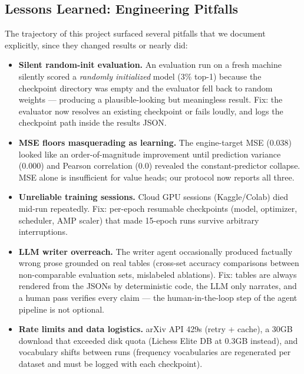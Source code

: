 \documentclass[conference,onecolumn]{IEEEtran}
\begin{document}
\subsection{Lessons Learned: Engineering Pitfalls}
The trajectory of this project surfaced several pitfalls that we document explicitly, since they changed results or nearly did:
\begin{itemize}
\item \textbf{Silent random-init evaluation.} An evaluation run on a fresh machine silently scored a \emph{randomly initialized} model (3\% top-1) because the checkpoint directory was empty and the evaluator fell back to random weights --- producing a plausible-looking but meaningless result. Fix: the evaluator now resolves an existing checkpoint or fails loudly, and logs the checkpoint path inside the results JSON.
\item \textbf{MSE floors masquerading as learning.} The engine-target MSE (0.038) looked like an order-of-magnitude improvement until prediction variance (0.000) and Pearson correlation (0.0) revealed the constant-predictor collapse. MSE alone is insufficient for value heads; our protocol now reports all three.
\item \textbf{Unreliable training sessions.} Cloud GPU sessions (Kaggle/Colab) died mid-run repeatedly. Fix: per-epoch resumable checkpoints (model, optimizer, scheduler, AMP scaler) that made 15-epoch runs survive arbitrary interruptions.
\item \textbf{LLM writer overreach.} The writer agent occasionally produced factually wrong prose grounded on real tables (cross-set accuracy comparisons between non-comparable evaluation sets, mislabeled ablations). Fix: tables are always rendered from the JSONs by deterministic code, the LLM only narrates, and a human pass verifies every claim --- the human-in-the-loop step of the agent pipeline is not optional.
\item \textbf{Rate limits and data logistics.} arXiv API 429s (retry + cache), a 30GB download that exceeded disk quota (Lichess Elite DB at 0.3GB instead), and vocabulary shifts between runs (frequency vocabularies are regenerated per dataset and must be logged with each checkpoint).
\end{itemize}
\end{document}
